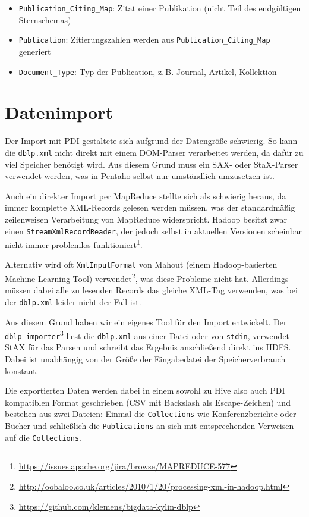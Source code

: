 \documentclass[a4paper,11pt,utf8]{scrartcl}
\begin{document}
\begin{itemize}
    \item \texttt{Publication\_Citing\_Map}: Zitat einer Publikation (nicht Teil des endgültigen Sternschemas)
    \item \texttt{Publication}: Zitierungszahlen werden aus \texttt{Publication\_Citing\_Map} generiert
    \item \texttt{Document\_Type}: Typ der Publication, z.\,B. Journal, Artikel, Kollektion
\end{itemize}

\section{Datenimport}

Der Import mit PDI gestaltete sich aufgrund der Datengröße schwierig. So kann die \texttt{dblp.xml} nicht direkt mit einem DOM-Parser verarbeitet werden, da dafür zu viel Speicher benötigt wird. Aus diesem Grund muss ein SAX- oder StaX-Parser verwendet werden, was in Pentaho selbst nur umständlich umzusetzen ist.

Auch ein direkter Import per MapReduce stellte sich als schwierig heraus, da immer komplette XML-Records gelesen werden müssen, was der standardmäßig zeilenweisen Verarbeitung von MapReduce widerspricht. Hadoop besitzt zwar einen \texttt{StreamXmlRecordReader}, der jedoch selbst in aktuellen Versionen scheinbar nicht immer problemlos funktioniert\footnote{\url{https://issues.apache.org/jira/browse/MAPREDUCE-577}}.

Alternativ wird oft \texttt{XmlInputFormat} von Mahout (einem Hadoop-basierten Machine-Learning-Tool) verwendet\footnote{\url{http://oobaloo.co.uk/articles/2010/1/20/processing-xml-in-hadoop.html}}, was diese Probleme nicht hat. Allerdings müssen dabei alle zu lesenden Records das gleiche XML-Tag verwenden, was bei der \texttt{dblp.xml} leider nicht der Fall ist.

Aus diesem Grund haben wir ein eigenes Tool für den Import entwickelt. Der \texttt{dblp-importer}\footnote{\url{https://github.com/klemens/bigdata-kylin-dblp}} liest die \texttt{dblp.xml} aus einer Datei oder von \texttt{stdin}, verwendet StAX für das Parsen und schreibt das Ergebnis anschließend direkt ins HDFS. Dabei ist unabhängig von der Größe der Eingabedatei der Speicherverbrauch konstant.

Die exportierten Daten werden dabei in einem sowohl zu Hive also auch PDI kompatiblen Format geschrieben (CSV mit Backslash als Escape-Zeichen) und bestehen aus zwei Dateien: Einmal die \texttt{Collections} wie Konferenzberichte oder Bücher und schließlich die \texttt{Publications} an sich mit entsprechenden Verweisen auf die \texttt{Collections}.
\end{document}
